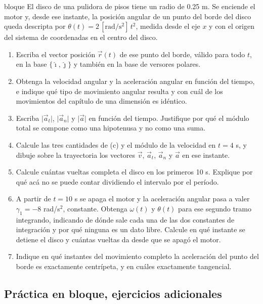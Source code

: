 \documentclass[11pt,openany]{book}
\begin{document}
\begin{ejercicio}{bloque}
El disco de una pulidora de pisos tiene un radio de 0.25 m. Se enciende el motor y, desde ese instante, la posición angular de un punto del borde del disco queda descripta por $\theta(t) = 2\,[\mathrm{rad/s^2}]\,t^2$, medida desde el eje $x$ y con el origen del sistema de coordenadas en el centro del disco.
\begin{enumerate}[label=(\alph*), leftmargin=1.7em, itemsep=1pt, topsep=3pt]
  \item Escriba el vector posición $\vec r(t)$ de ese punto del borde, válido para todo $t$, en la base $\{\hat\imath, \hat\jmath\}$ y también en la base de versores polares.
  \item Obtenga la velocidad angular y la aceleración angular en función del tiempo, e indique qué tipo de movimiento angular resulta y con cuál de los movimientos del capítulo de una dimensión es idéntico.
  \item Escriba $\lvert\vec a_t\rvert$, $\lvert\vec a_n\rvert$ y $\lvert\vec a\rvert$ en función del tiempo. Justifique por qué el módulo total se compone como una hipotenusa y no como una suma.
  \item Calcule las tres cantidades de (c) y el módulo de la velocidad en $t = 4$ s, y dibuje sobre la trayectoria los vectores $\vec v$, $\vec a_t$, $\vec a_n$ y $\vec a$ en ese instante.
  \item Calcule cuántas vueltas completa el disco en los primeros 10 s. Explique por qué acá no se puede contar dividiendo el intervalo por el período.
  \item A partir de $t = 10$ s se apaga el motor y la aceleración angular pasa a valer $\gamma_1 = -8$ rad/s$^2$, constante. Obtenga $\omega(t)$ y $\theta(t)$ para ese segundo tramo integrando, indicando de dónde sale cada una de las dos constantes de integración y por qué ninguna es un dato libre. Calcule en qué instante se detiene el disco y cuántas vueltas da desde que se apagó el motor.
  \item Indique en qué instantes del movimiento completo la aceleración del punto del borde es exactamente centrípeta, y en cuáles exactamente tangencial.
\end{enumerate}
\end{ejercicio}

\subsection{Práctica en bloque, ejercicios adicionales}
\end{document}
